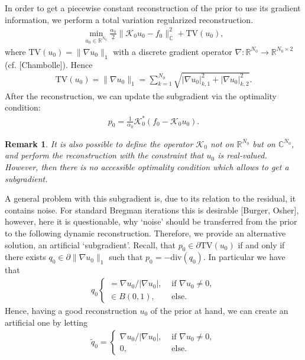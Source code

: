 \documentclass{article}
\newcommand{\TV}{\mathrm{TV}}
\newcommand{\C}{\mathbb{C}}
\newcommand{\R}{\mathbb{R}}
\newcommand{\diverg}{\mathrm{div}}
\newcommand{\Kcal}{\mathcal{K}}
\newcommand{\qt}{\tilde{q}}
\newtheorem{myrem}{Remark}
\begin{document}
In order to get a piecewise constant reconstruction of the prior to use its gradient information, we perform a total variation regularized reconstruction. 
\begin{align}
   \min_{u_0 \in \R^{N_0}} \frac{\alpha_0}{2} \| \Kcal_0 u_0 - f_0\|_\C^2 + \TV(u_0),
   \label{eq:l2_tv}
\end{align}
where $\TV(u_0) = \| \nabla u_0 \|_1$ with a discrete gradient operator $\nabla \colon \R^{N_0} \to \R^{N_0 \times 2}$ (cf. [Chambolle]).
Hence 
\begin{align*}
 \TV(u_0) = \| \nabla u_0 \|_1 = \sum_{k=1}^{N_0} \sqrt{ |\nabla u_0|^2_{k,1} + |\nabla u_0|^2_{k,2} }.
\end{align*}
After the reconstruction, we can update the subgradient via the optimality condition: 
\begin{align}
 p_0 = \frac{1}{\alpha_0} \Kcal_0^* ( f_0 - \Kcal_0 u_0).
 \label{eq:pr_subgradient}
\end{align}
%
\begin{myrem}
 It is also possible to define the operator $\Kcal_0$ not on $\R^{N_0}$ but on $\C^{N_0}$, and perform the reconstruction with the constraint that $u_0$ is real-valued. 
 However, then there is no accessible optimality condition which allows to get a subgradient. 
\end{myrem}
%
A general problem with this subgradient is, due to its relation to the residual, it contains noise. 
For standard Bregman iterations this is desirable [Burger, Osher], however, here it is questionable, why `noise' should be transferred from the prior to the following dynamic reconstruction.
Therefore, we provide an alternative solution, an artificial `subgradient'.
Recall, that $p_0 \in \partial \TV(u_0)$ if and only if there exists $q_0 \in \partial \|\nabla u_0\|_1$ such that $p_0 = - \diverg(q_0)$.
In particular we have that 
\begin{align*}
 q_0 \begin{cases}
        = \nabla u_0 / |\nabla u_0|, &\text{ if } \nabla u_0 \neq 0, \\
        \in B(0,1), &\text{ else. }
       \end{cases}
\end{align*}
Hence, having a good reconstruction $u_0$ of the prior at hand, we can create an artificial one by letting 
\begin{align*}
 \qt_0 = \begin{cases}
        \nabla u_0 / |\nabla u_0|, &\text{ if } \nabla u_0 \neq 0, \\
        0, &\text{ else. }
       \end{cases}
\end{align*}
\end{document}
